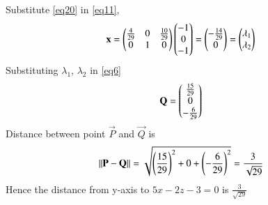 \documentclass[journal,12pt,twocolumn]{IEEEtran}
\begin{document}
Substitute \eqref{eq20} in \eqref{eq11},
\begin{align}
	\mathbf{x} = \begin{pmatrix}\frac{4}{29} & 0 & \frac{10}{29}\\0 & 1 & 0\end{pmatrix}\begin{pmatrix}-1\\0\\-1\end{pmatrix} = \begin{pmatrix}-\frac{14}{29}\\0\end{pmatrix} = \begin{pmatrix}\lambda_1 \\ \lambda_2\end{pmatrix}
\end{align}
Substituting $\lambda_1$, $\lambda_2$ in \eqref{eq6}
\begin{equation}
	\mathbf{Q} = \begin{pmatrix}\frac{15}{29}\\0\\-\frac{6}{29}\end{pmatrix}
\end{equation}
Distance between point $\vec{P}$ and $\vec{Q}$ is
\begin{align}
	\left\lVert\mathbf{P}-\mathbf{Q}\right\rVert = \sqrt{\left(\frac{15}{29}\right)^2 + 0 + \left(-\frac{6}{29}\right)^2} = \frac{3}{\sqrt{29}}
\end{align}
Hence the distance from y-axis to $5x - 2z - 3 = 0$ is $\frac{3}{\sqrt{29}}$
\end{document}

